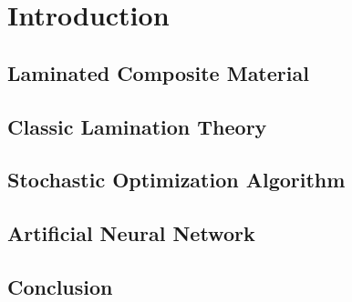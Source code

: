
\chapter{Introduction} %

\label{Chapter1} %


\section{Laminated Composite Material}

\section{Classic Lamination Theory}

\section{Stochastic Optimization Algorithm}

\section{Artificial Neural Network}

\section{Conclusion}


